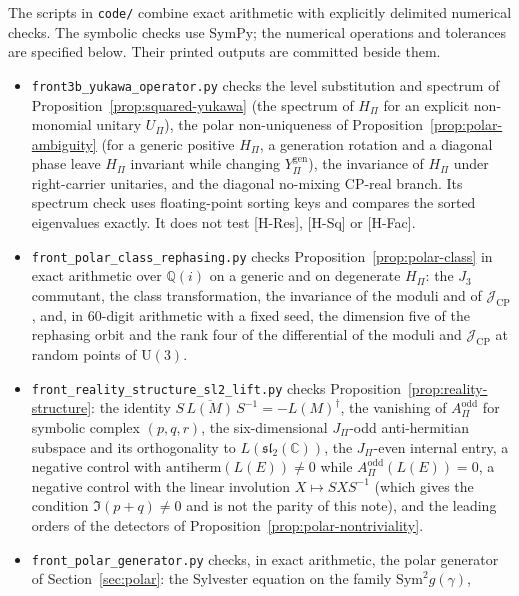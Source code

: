 \documentclass[11pt]{article}
\theoremstyle{definition}
\theoremstyle{remark}
\newcommand{\JPi}{J_{\Pi}}
\newcommand{\Jthree}{J_{3}}
\newcommand{\Ygen}{{Y^{\mathrm{gen}}_{\Pi}}}
\newcommand{\JCP}{\mathcal{J}_{\mathrm{CP}}}
\newcommand{\Hpi}{H_{\Pi}}
\newcommand{\Upi}{U_{\Pi}}
\newcommand{\Aodd}{A_{\Pi}^{\mathrm{odd}}}
\newcommand{\Sym}{\mathrm{Sym}}
\newcommand{\UU}{\mathrm{U}}
\begin{document}
    The scripts in \texttt{code/} combine exact arithmetic with explicitly delimited numerical checks.
    The symbolic checks use SymPy; the numerical operations and tolerances are specified below.
    Their printed outputs are committed beside them.
    \begin{itemize}
      \item \texttt{front3b\_yukawa\_operator.py} checks the level substitution and spectrum of
        Proposition~\ref{prop:squared-yukawa} (the spectrum of $\Hpi$ for an explicit non-monomial unitary $\Upi$), the
        polar
        non-uniqueness of Proposition~\ref{prop:polar-ambiguity} (for a generic positive $\Hpi$, a generation rotation
        and
        a diagonal phase leave $\Hpi$ invariant while changing $\Ygen$), the invariance of $\Hpi$ under right-carrier
        unitaries, and the diagonal no-mixing CP-real branch.
        Its spectrum check uses floating-point sorting keys and compares the sorted eigenvalues exactly.
        It does not test [H-Res], [H-Sq] or [H-Fac].
      \item \texttt{front\_polar\_class\_rephasing.py} checks Proposition~\ref{prop:polar-class} in exact arithmetic
        over $\mathbb{Q}(i)$ on a generic and on degenerate $\Hpi$: the $\Jthree$ commutant, the class transformation,
        the
        invariance of the moduli and of $\JCP$, and, in 60-digit arithmetic with a fixed seed, the dimension five of the
        rephasing orbit and the rank four of the differential of the moduli and $\JCP$ at random points of $\UU(3)$.
      \item \texttt{front\_reality\_structure\_sl2\_lift.py} checks Proposition~\ref{prop:reality-structure}: the
      identity
        $S\,\overline{L(M)}\,S^{-1} = -L(M)^{\dagger}$, the vanishing of $\Aodd$ for symbolic complex $(p, q, r)$, the
        six-dimensional $\JPi$-odd anti-hermitian subspace and its orthogonality to $L(\mathfrak{sl}_{2}(\mathbb{C}))$,
        the
        $\JPi$-even internal entry, a negative control with $\mathrm{antiherm}(L(E)) \neq 0$ while $\Aodd(L(E)) = 0$,
        a negative control with the linear involution $X \mapsto S X S^{-1}$ (which gives
        the condition $\Im(p+q) \neq 0$ and is not the parity of this note), and the leading orders of the detectors of
        Proposition~\ref{prop:polar-nontriviality}.
      \item \texttt{front\_polar\_generator.py} checks, in exact arithmetic, the polar generator of
        Section~\ref{sec:polar}: the Sylvester equation on the family $\Sym^{2}g(\gamma)$,

\end{itemize}
\end{document}
